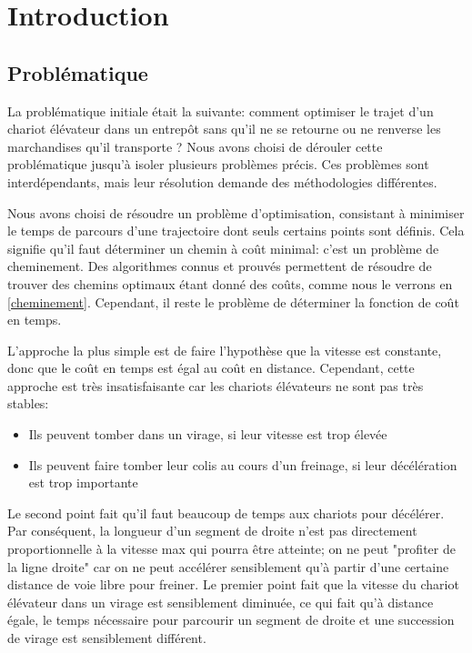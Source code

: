 \section*{Introduction}

\subsection{Problématique}
La problématique initiale était la suivante: comment optimiser le trajet d’un chariot élévateur dans un entrepôt sans qu’il ne se retourne ou ne renverse les marchandises qu’il transporte ? Nous avons choisi de dérouler cette problématique jusqu'à isoler plusieurs problèmes précis. Ces problèmes sont interdépendants, mais leur résolution demande des méthodologies différentes.

Nous avons choisi de résoudre un problème d'optimisation, consistant à minimiser le temps de parcours d'une trajectoire dont seuls certains points sont définis. Cela signifie qu'il faut déterminer un chemin à coût minimal: c'est un problème de cheminement. Des algorithmes connus et prouvés permettent de résoudre de trouver des chemins optimaux étant donné des coûts, comme nous le verrons en \ref{cheminement}. Cependant, il reste le problème de déterminer la fonction de coût en temps.

L'approche la plus simple est de faire l'hypothèse que la vitesse est constante, donc que le coût en temps est égal au coût en distance. Cependant, cette approche est très insatisfaisante car les chariots élévateurs ne sont pas très stables:
\begin{itemize}
	\item Ils peuvent tomber dans un virage, si leur vitesse est trop élevée
	\item Ils peuvent faire tomber leur colis au cours d'un freinage, si leur décélération est trop importante
\end{itemize}
Le second point fait qu'il faut beaucoup de temps aux chariots pour décélérer. Par conséquent, la longueur d'un segment de droite n'est pas directement proportionnelle à la vitesse max qui pourra être atteinte; on ne peut "profiter de la ligne droite" car on ne peut accélérer sensiblement qu'à partir d'une certaine distance de voie libre pour freiner.
Le premier point fait que la vitesse du chariot élévateur dans un virage est sensiblement diminuée, ce qui fait qu'à distance égale, le temps nécessaire pour parcourir un segment de droite et une succession de virage est sensiblement différent.

